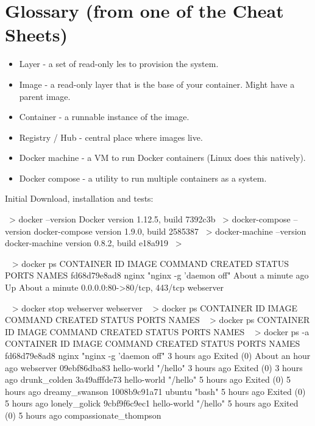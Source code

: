 \documentclass[11pt]{article}
\begin{document}
\newpage
\section{Glossary (from one of the Cheat Sheets)}

\begin{itemize}					
\item{Layer - a set of read-only les to provision the system.}
\item{Image - a read-only layer that is the base of your container. Might have a parent image.}
\item{Container - a runnable instance of the image.}
\item{Registry / Hub - central place where images live.}
\item{Docker machine - a VM to run Docker containers (Linux does this natively).}
\item{Docker compose - a utility to run multiple containers as a system.}
\end{itemize}					
			
		


Initial Download, installation and tests:

~> docker --version
Docker version 1.12.5, build 7392c3b
~> docker-compose --version
docker-compose version 1.9.0, build 2585387
~> docker-machine --version
docker-machine version 0.8.2, build e18a919
~> 


~ > docker ps  %
CONTAINER ID  IMAGE   COMMAND     CREATED  STATUS PORTS NAMES
fd68d79e8ad8  nginx   "nginx -g 'daemon off"   About a minute ago   Up About a minute   0.0.0.0:80->80/tcp, 443/tcp   webserver

~ > docker stop webserver 
webserver
~ > docker ps
CONTAINER ID        IMAGE               COMMAND             CREATED             STATUS              PORTS               NAMES
~ > docker ps
CONTAINER ID        IMAGE               COMMAND             CREATED             STATUS              PORTS               NAMES
~ > docker ps -a
CONTAINER ID        IMAGE               COMMAND                  CREATED             STATUS                         PORTS               NAMES
fd68d79e8ad8        nginx               "nginx -g 'daemon off"   3 hours ago         Exited (0) About an hour ago                       webserver
09ebf86dba83        hello-world         "/hello"                 3 hours ago         Exited (0) 3 hours ago                             drunk_colden
3a49afffde73        hello-world         "/hello"                 5 hours ago         Exited (0) 5 hours ago                             dreamy_swanson
1008b9c91a71        ubuntu              "bash"                   5 hours ago         Exited (0) 5 hours ago                             lonely_golick
9cbf9f6c9ec1        hello-world         "/hello"                 5 hours ago         Exited (0) 5 hours ago                             compassionate_thompson
\end{document}
